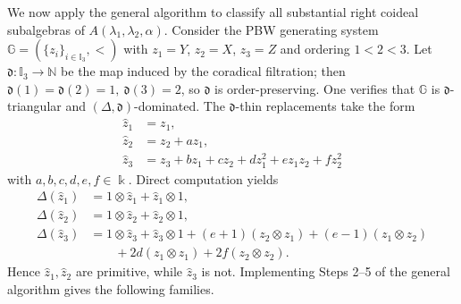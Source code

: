 \documentclass{article}
\theoremstyle{plain}
\theoremstyle{definition}
\numberwithin{equation}{section}
\newcommand{\GG}{\mathbb{G}}
\newcommand{\II}{\mathbb{I}}
\newcommand{\dd}{\mathfrak{d}}
\begin{document}
	We now apply the general algorithm to classify all substantial right coideal subalgebras of $A(\lambda_{1},\lambda_{2},\alpha)$. Consider the PBW generating system $\GG=(\{z_{i}\}_{i\in\II_{3}},<)$ with
	$z_{1}=Y$, $z_{2}=X$, $z_{3}=Z$ and ordering $1<2<3$.
	Let $\dd\colon\II_{3} \to \mathbb{N}$ be the map induced by the coradical filtration; then
	$\dd(1)=\dd(2)=1,\ \dd(3)=2$, so $\dd$ is order-preserving. One verifies that $\GG$ is $\dd$-triangular and $(\Delta,\dd)$-dominated. The $\dd$-thin replacements take the form
	\[
	\begin{aligned}
		\hat z_{1} &= z_{1},\\
		\hat z_{2} &= z_{2} + a z_{1},\\
		\hat z_{3} &= z_{3} + bz_{1} + cz_{2} + dz_{1}^{2} + ez_{1}z_{2} + fz_{2}^{2}
	\end{aligned}
	\]
	with $a,b,c,d,e,f\in\Bbbk$. Direct computation yields
	\[
	\begin{aligned}
		\Delta(\hat z_{1}) &= 1\otimes\hat z_{1} + \hat z_{1}\otimes1,\\
		\Delta(\hat z_{2}) &= 1\otimes\hat z_{2} + \hat z_{2}\otimes1,\\
		\Delta(\hat z_{3}) &= 1\otimes\hat z_{3} + \hat z_{3}\otimes1
		+ (e+1)(z_{2}\otimes z_{1}) + (e-1)(z_{1}\otimes z_{2}) \\
		&\qquad + 2d(z_{1}\otimes z_{1}) + 2f(z_{2}\otimes z_{2}).
	\end{aligned}
	\]
	Hence $\hat z_{1},\hat z_{2}$ are primitive, while $\hat z_{3}$ is not. Implementing Steps 2–5 of the general algorithm gives the following families.
\end{document}
